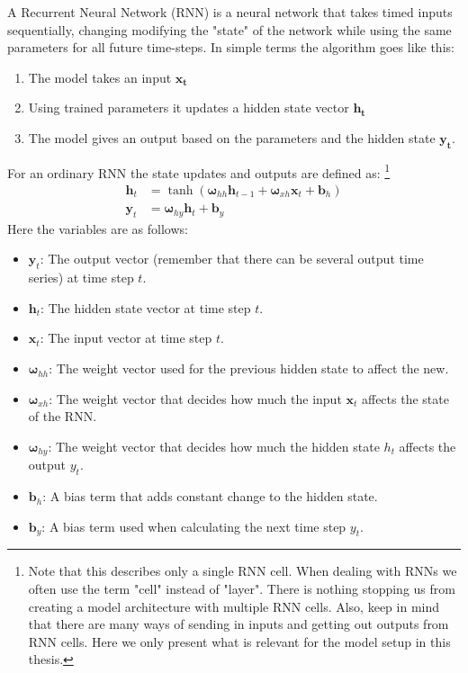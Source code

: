 A Recurrent Neural Network (RNN) is a neural network that takes timed inputs 
sequentially, changing modifying the "state" of the network while using the same 
parameters for all future time-steps. In simple terms the algorithm goes like this:
\begin{enumerate}
    \item The model takes an input $\bm{x_t}$
    \item Using trained parameters it updates a hidden state vector $\bm{h_t}$
    \item The model gives an output based on the parameters and the hidden state $\bm{y_t}$.
\end{enumerate}
For an ordinary RNN the state updates and outputs are defined as: 
\footnote{Note that this describes only a single RNN cell. When dealing with RNNs 
we often use the term "cell" instead of "layer". There is nothing stopping us from 
creating a model architecture with multiple RNN cells. Also, keep in mind that there 
are many ways of sending in inputs and getting out outputs from RNN cells. Here we 
only present what is relevant for the model setup in this thesis.}
\begin{align}
    \bm{h}_t &= \tanh{(\bm{\omega}_{hh}\bm{h}_{t-1} + \bm{\omega}_{xh}\bm{x}_t+\bm{b}_h)} \\
    \bm{y}_t &= \bm{\omega}_{hy}\bm{h}_t + \bm{b}_y  \label{RNN output}
\end{align}
Here the variables are as follows:
\begin{itemize}
    \item $\bm{y}_t$: The output vector (remember that there can be several output time series) at time step $t$.
    \item $\bm{h}_t$: The hidden state vector at time step $t$.
    \item $\bm{x}_t$: The input vector at time step $t$.
    \item $\bm{\omega}_{hh}$: The weight vector used for the previous hidden state to affect the new.
    \item $\bm{\omega}_{xh}$: The weight vector that decides how much the input $\bm{x}_t$ affects the state of the RNN.
    \item $\bm{\omega}_{hy}$: The weight vector that decides how much the hidden state $h_t$ affects the output $y_t$.
    \item $\bm{b}_h$: A bias term that adds constant change to the hidden state.
    \item $\bm{b}_y$: A bias term used when calculating the next time step $y_t$.
\end{itemize}

